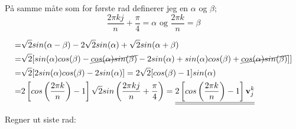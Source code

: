 \documentclass[a4paper,12pt,norsk]{article}
\begin{document}
På samme måte som for første rad definerer jeg en $\alpha$ og $\beta$; $$\frac{2\pi kj}{n} +\frac{\pi}{4} = \alpha \text{ og } \frac{2\pi k}{n} = \beta$$

\begin{align*}
=& \sqrt{2}sin(\alpha - \beta) -2\sqrt{2}sin(\alpha) + \sqrt{2}sin(\alpha + \beta)\\
=& \sqrt{2}[sin(\alpha)cos(\beta) - \cancel{cos(\alpha)sin(\beta)} -2sin(\alpha) + sin(\alpha)cos(\beta) + \cancel{cos(\alpha)sin(\beta)}]] \\
=& \sqrt{2}[2sin(\alpha)cos(\beta) - 2sin(\alpha)] = 2\sqrt{2}[cos(\beta) - 1]sin(\alpha)\\ 
=& 2\left[cos\left(\frac{2\pi k}{n} \right)-1\right]\sqrt{2}sin\left( \frac{2\pi kj}{n} + \frac{\pi}{4}\right)
= \underline{\underline{2\left[cos\left(\frac{2\pi k}{n}\right) - 1\right]\bold{v}^k_j }}
\end{align*}

Regner ut siste rad:
\end{document}
